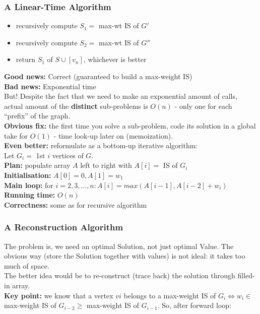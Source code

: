 \documentclass{scrartcl}
\begin{document}
\subsubsection{A Linear-Time Algorithm}
\label{sec:8-3}
\begin{itemize}
\item recursively compute $S_1 = $ max-wt IS of $G'$
\item recursively compute $S_2 = $ max-wt IS of $G''$
\item return $S_1$ of $S \cup [v_n]$, whichever is better
\end{itemize}
{\bf Good news: } Correct (guaranteed to build a max-weight IS)\\
{\bf Bad news: }  Exponential time\\
But! Despite the fact that we need to make an exponential amount of calls,
actual amount of the {\bf distinct } sub-problems is $O(n)$ - only one for each
``prefix'' of the graph.\\
{\bf Obvious fix: } the first time you solve a sub-problem, code its solution in
a global take for $O(1)$ - time look-up later on (memoization).\\
{\bf Even better: } reformulate as a bottom-up iterative algorithm:\\
Let $G_i = $ 1st $i$ vertices of $G$.\\
{\bf Plan: } populate array $A$ left to right with $A[i] = $ IS of $G_i$\\
{\bf Initialisation: } $A[0] = 0,A[1] = w_1$\\
{\bf Main loop: } for $i = 2, 3, \dots, n: A[i] = max(A[i-1],A[i-2] + w_i)$\\
{\bf Running time: } $O(n)$\\
{\bf Correctness: } some as for recursive algorithm

\subsubsection{A Reconstruction Algorithm}
\label{sec:8-4}

The problem is, we need an optimal Solution, not just optimal Value. The obvious
way (store the Solution together with values) is not ideal: it takes too much of
space.\\
The better idea would be to re-construct (trace back) the solution through
filled-in array. \\
{\bf Key point: } we know that a vertex $vi$ belongs to a max-weight IS of $G_i
\Leftrightarrow w_i \in $ max-weight IS of $G_{i-2} \geq $ max-weight IS of
$G_{i-1}$. So, after forward loop:\\
\end{document}
